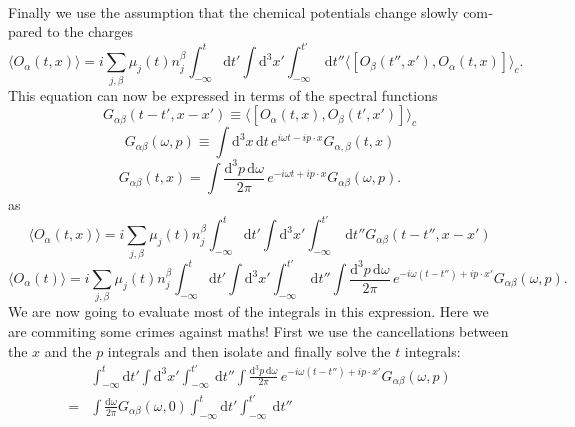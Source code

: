 \documentclass[master,       %
               twoside,        %
               BCOR10mm,       %
               english,ngerman, %
               ]{GAUBM}
\begin{document}
\begin{otherlanguage}{english}
\begin{align}
\end{align}
Finally we use the assumption that the chemical potentials change slowly compared to the charges
\begin{equation}
	\langle O_\alpha(t, x) \rangle = i \sum_{j, \beta} \mu_j(t) n^\beta_j  \int_{-\infty}^t \mathrm{d} t' \int \mathrm{d}^3 x' \int^{t'}_{-\infty} \ \mathrm{d} t'' \langle [ O_\beta(t'', x'), O_\alpha(t, x)] \rangle_c.
\end{equation}
This equation can now be expressed in terms of the spectral functions
\begin{equation}
	G_{\alpha \beta}(t - t', x - x') \equiv \langle [ O_\alpha(t, x), O_\beta(t', x')] \rangle_{c}
\end{equation}
\begin{equation}G_{\alpha \beta}(\omega, p) \equiv \int \mathrm{d}^3 x \, \mathrm{d} t \, e^{i \omega t - i p \cdot x} G_{\alpha, \beta}(t, x)
\end{equation}
\begin{equation}G_{\alpha \beta}(t, x) = \int \frac{\mathrm{d}^3 p \, \mathrm{d} \omega}{2 \pi} \, e^{- i \omega t + i p \cdot x} G_{\alpha \beta}(\omega, p).
\end{equation}
as
\begin{equation}
	\langle O_\alpha(t, x) \rangle = i \sum_{j, \beta} \mu_j(t) n^\beta_j  \int_{-\infty}^t \mathrm{d} t' \int \mathrm{d}^3 x' \int^{t'}_{-\infty} \ \mathrm{d} t'' G_{\alpha \beta}(t - t'', x - x')
\end{equation}
\begin{equation}
	\langle O_\alpha(t) \rangle = i \sum_{j, \beta} \mu_j(t) n^\beta_j  \int_{-\infty}^t \mathrm{d} t' \int \mathrm{d}^3 x' \int^{t'}_{-\infty} \ \mathrm{d} t''
	\int \frac{\mathrm{d}^3 p \, \mathrm{d} \omega}{2 \pi} \, e^{- i \omega (t - t'') + i p \cdot x'} G_{\alpha \beta}(\omega, p).
\end{equation}
We are now going to evaluate most of the integrals in this expression. Here we are commiting some crimes against maths! First we use the cancellations between the $x$ and the $p$ integrals and then isolate and finally solve the $t$ integrals:
\begin{align}
	& \int_{-\infty}^t \mathrm{d} t' \int \mathrm{d}^3 x' \int^{t'}_{-\infty} \ \mathrm{d} t''
	\int \frac{\mathrm{d}^3 p \, \mathrm{d} \omega}{2 \pi} \, e^{- i \omega (t - t'') + i p \cdot x'} G_{\alpha \beta}(\omega, p) \nonumber \\
	= & \int \frac{\mathrm{d} \omega}{2 \pi} G_{\alpha \beta}(\omega, 0) \int_{-\infty}^t \mathrm{d} t' \int^{t'}_{-\infty} \ \mathrm{d} t''

\end{align}
\end{otherlanguage}
\end{document}
